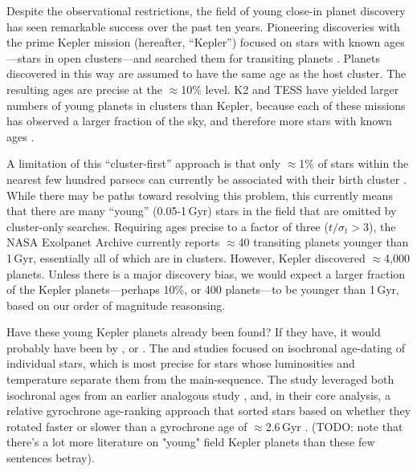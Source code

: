 \documentclass[11pt,twocolumn,tighten]{aastex63}
\begin{document}

Despite the observational restrictions, the field of young close-in
planet discovery has seen remarkable success over the past ten years.
Pioneering discoveries with the prime Kepler mission (hereafter,
``Kepler'') focused on stars with known ages---stars in open
clusters---and searched them for transiting planets
\citep{Meibom_2013}.  Planets discovered in this way are assumed to
have the same age as the host cluster.  The resulting ages are precise
at the $\approx$10\% level.  K2 and TESS have yielded larger numbers
of young planets in clusters than Kepler, because each of these
missions has observed a larger fraction of the sky, and therefore more
stars with known ages
\citep[e.g.][]{Mann_K2_25_2016,Mann_2017,Curtis_2018,Livingston_2018,David_2019,Bouma_2020_toi837,Rizzuto_2020,Plavchan_2020,Newton_2021,Nardiello_2022,Tofflemire_2021,Zhou_2022,Zakhozhay_2022,Wood_2023}.

A limitation of this ``cluster-first'' approach is that only
$\approx$1\% of stars within the nearest few hundred parsecs can
currently be associated with their birth cluster
\citep[e.g.][]{Zari_2018,CantatGaudin_2020,Kounkel_2020,Kerr_2021}.
While there may be paths toward resolving this problem, this currently
means that there are many ``young'' (0.05-1\,Gyr) stars in the field
that are omitted by cluster-only searches.  Requiring ages precise to
a factor of three ($t/\sigma_t > 3$), the NASA Exolpanet Archive
currently reports $\approx$40 transiting planets younger than 1\,Gyr,
essentially all of which are in clusters.  However, Kepler discovered
$\approx$4{,}000 planets.  Unless there is a major discovery bias, we
would expect a larger fraction of the Kepler planets---perhaps 10\%,
or 400 planets---to be younger than 1\,Gyr, based on our order of
magnitude reasonsing.

Have these young Kepler planets already been found?  If they have, it
would probably have been by \citet{Berger_2020b_rpage},
\citet{David_2021} or \citet{Petigura_2022}.  The
\citeauthor{Berger_2020b_rpage} and \citeauthor{Petigura_2022} studies
focused on isochronal age-dating of individual stars, which is most
precise for stars whose luminosities and temperature separate them
from the main-sequence.  The \citeauthor{David_2021} study leveraged
both isochronal ages from an earlier analogous study
\citep{Fulton_Petigura_2018_cks_vii}, and, in their core analysis, a
relative gyrochrone age-ranking approach that sorted stars based on
whether they rotated faster or slower than a gyrochrone age of
$\approx$2.6\,Gyr \citep{Meibom_2015,Curtis_2020}.  (TODO: note that
there's a lot more literature on "young" field Kepler planets than
these few sentences betray).
\end{document}
